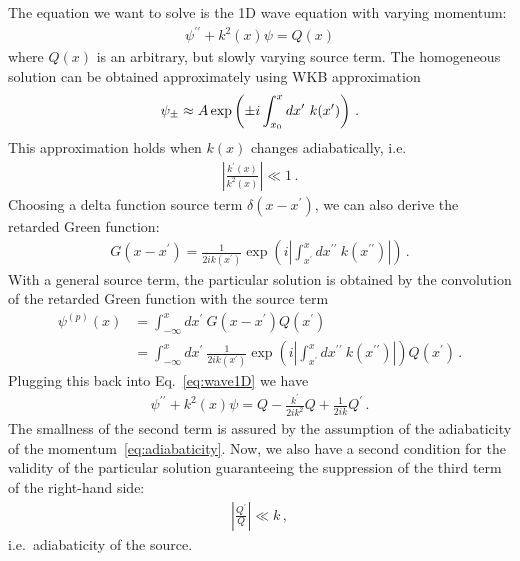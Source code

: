 \documentclass[a4paper,11pt]{article}
\begin{document}
The equation we want to solve is the 1D wave equation with varying momentum:
%
\begin{align}
 \psi^{\prime\prime} +
 k^{2}(x) \psi = Q(x)
 \label{eq:wave1D}
\end{align}
%
where $ Q(x) $ is an arbitrary, but slowly varying source term.
%
The homogeneous solution can be obtained approximately using WKB approximation 
%
\begin{align}
    \psi_{\rm \pm} \approx A \exp \left( \pm i \int_{x_{0}}^{x} dx^{\prime} ~ k(x^{\prime}) \right)  \,.
\end{align}
%
This approximation holds when $ k(x) $ changes adiabatically, i.e.
%
\begin{align}
    \left\vert \frac{k^{\prime}(x)}{ k^{2} (x) } \right\vert  \ll 1 \,.
    \label{eq:adiabaticity}
\end{align}
%
Choosing a delta function source term $ \delta (x-x^{\prime}) $, we can also derive the retarded Green function:
\begin{align}
  G(x-x^{\prime}) = \frac{1}{2 i k(x^{\prime})} \exp \left( i \left\vert \int_{x^{\prime}}^{x} dx^{\prime\prime} ~ k(x^{\prime\prime}) \right\vert  \right) \,.
\end{align}
%
With a general source term, the particular solution is obtained by the convolution of the retarded Green function with the source term
%
\begin{equation}
\begin{aligned}
    \psi^{(p)}(x) & = \int_{-\infty}^{x} dx^{\prime} ~  G(x-x^{\prime}) Q(x^{\prime}) \\
    & = \int_{-\infty}^{x} dx^{\prime} ~ \frac{1}{2 i k(x^{\prime}) } \exp \left( i \left\vert \int_{x^{\prime}}^{x} dx^{\prime\prime} ~ k(x^{\prime\prime}) \right\vert  \right) Q(x^{\prime}) \,. \label{eq:WKB_sol}
\end{aligned}
\end{equation}
%
Plugging this back into Eq.~\eqref{eq:wave1D} we have
%
\begin{align}
    \psi^{\prime\prime} + k^{2}(x) \psi  = Q - \frac{ k^{\prime}}{2 i k^{2}} Q + \frac{1}{2 i k} Q^{\prime} \,.
\end{align}
%
The smallness of the second term is assured by the assumption of the adiabaticity of the momentum~\eqref{eq:adiabaticity}.
%
Now, we also have a second condition for the validity of the particular solution guaranteeing the suppression of the third term of the right-hand side:
%
\begin{align}
    \left\vert \frac{Q^{\prime}}{Q} \right\vert \ll k \, ,
\end{align}
%
i.e.\ adiabaticity of the source.
\end{document}
